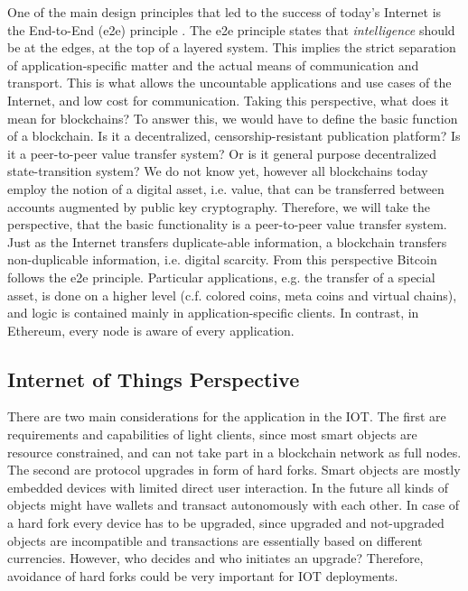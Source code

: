 One of the main design principles that led to the success of today's Internet is the End-to-End (e2e) principle \parencite{Saltzer:1984:EAS:357401.357402}. The e2e principle states that \emph{intelligence} should be at the edges, at the top of a layered system. This implies the strict separation of application-specific matter and the actual means of communication and transport. This is what allows the uncountable applications and use cases of the Internet, and low cost for communication. Taking this perspective, what does it mean for blockchains? To answer this, we would have to define the basic function of a blockchain. Is it a decentralized, censorship-resistant publication platform? Is it a peer-to-peer value transfer system? Or is it general purpose decentralized state-transition system? We do not know yet, however all blockchains today employ the notion of a digital asset, i.e. value, that can be transferred between accounts augmented by public key cryptography. Therefore, we will take the perspective, that the basic functionality is a peer-to-peer value transfer system. Just as the Internet transfers duplicate-able information, a blockchain transfers non-duplicable information, i.e. digital scarcity. From this perspective Bitcoin follows the e2e principle. Particular applications, e.g. the transfer of a special asset, is done on a higher level (c.f. colored coins, meta coins and virtual chains), and logic is contained mainly in application-specific clients. In contrast, in Ethereum, every node is aware of every application.


\subsection*{Internet of Things Perspective}

There are two main considerations for the application in the \ac{IOT}. The first are requirements and capabilities of light clients, since most smart objects are resource constrained, and can not take part in a blockchain network as full nodes. The second are protocol upgrades in form of hard forks. Smart objects are mostly embedded devices with limited direct user interaction. In the future all kinds of objects might have wallets and transact autonomously with each other. In case of a hard fork every device has to be upgraded, since upgraded and not-upgraded objects are incompatible and transactions are essentially based on different currencies. However, who decides and who initiates an upgrade? Therefore, avoidance of hard forks could be very important for \ac{IOT} deployments.

